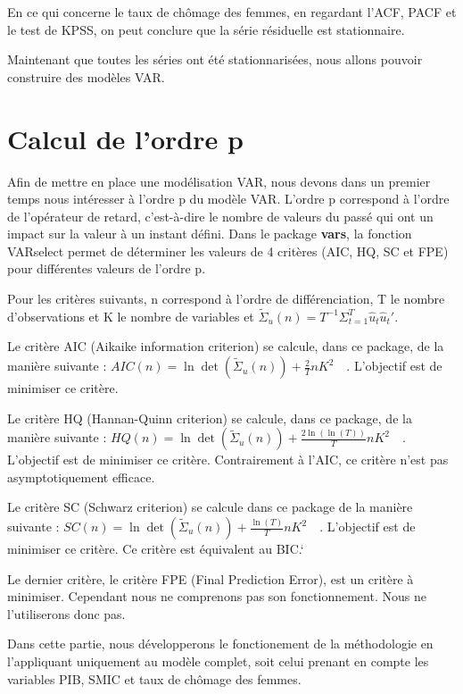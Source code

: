 \documentclass[11pt,]{article}
\begin{document}
En ce qui concerne le taux de chômage des femmes, en regardant l'ACF,
PACF et le test de KPSS, on peut conclure que la série résiduelle est
stationnaire.

Maintenant que toutes les séries ont été stationnarisées, nous allons
pouvoir construire des modèles VAR.

\section{Calcul de l'ordre p}\label{calcul-de-lordre-p}

Afin de mettre en place une modélisation VAR, nous devons dans un
premier temps nous intéresser à l'ordre p du modèle VAR. L'ordre p
correspond à l'ordre de l'opérateur de retard, c'est-à-dire le nombre de
valeurs du passé qui ont un impact sur la valeur à un instant défini.
Dans le package \textbf{vars}, la fonction VARselect permet de
déterminer les valeurs de 4 critères (AIC, HQ, SC et FPE) pour
différentes valeurs de l'ordre p.

Pour les critères suivants, n correspond à l'ordre de différenciation, T
le nombre d'observations et K le nombre de variables et
\(\tilde{\Sigma}_u (n) = T^{-1} \Sigma_{t=1}^T \hat{u}_t \hat{u}_t'\).

Le critère AIC (Aikaike information criterion) se calcule, dans ce
package, de la manière suivante :
\(AIC(n) = \ln \det(\tilde{\Sigma}_u(n)) + \frac{2}{T}n K^2 \quad\).
L'objectif est de minimiser ce critère.

Le critère HQ (Hannan-Quinn criterion) se calcule, dans ce package, de
la manière suivante :
\(HQ(n) = \ln \det(\tilde{\Sigma}_u(n)) + \frac{2 \ln(\ln(T))}{T}n K^2 \quad\).
L'objectif est de minimiser ce critère. Contrairement à l'AIC, ce
critère n'est pas asymptotiquement efficace.

Le critère SC (Schwarz criterion) se calcule dans ce package de la
manière suivante :
\(SC(n) = \ln \det(\tilde{\Sigma}_u(n)) + \frac{\ln(T)}{T}n K^2 \quad\).
L'objectif est de minimiser ce critère. Ce critère est équivalent au
BIC.`

Le dernier critère, le critère FPE (Final Prediction Error), est un
critère à minimiser. Cependant nous ne comprenons pas son
fonctionnement. Nous ne l'utiliserons donc pas.

Dans cette partie, nous développerons le fonctionement de la
méthodologie en l'appliquant uniquement au modèle complet, soit celui
prenant en compte les variables PIB, SMIC et taux de chômage des femmes.
\end{document}
